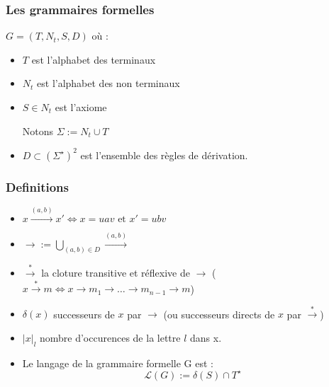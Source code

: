\documentclass[12pt]{beamer}
\title{\letitle}
\author{\leauthor}
\date{}
\newcommand{\norm}[1]{\lvert #1 \rvert}
\begin{document}
\begin{frame}
\titlepage
\end{frame}
    \begin{frame}\frametitle{Les grammaires formelles}

$G = (T,N_t,S,D)$ où :
\begin{itemize}
\item $T$ est l'alphabet des terminaux
\item $N_t$ est l'alphabet des non terminaux
\item $S \in N_t$ est l'axiome

Notons $\Sigma := N_t \cup T$
\item $D \subset (\Sigma ^ \star )^2$ est l'ensemble des règles de dérivation.
\end{itemize}
\end{frame}

\begin{frame}\frametitle{Definitions}
\begin{itemize}
\item $x \overset{(a,b)}{\rightarrow} x' \iff x = uav \text{ et } x' = ubv$
\pause
\item $\rightarrow := \bigcup_{(a,b) \in D} \overset{(a,b)}{\rightarrow}$ 
\pause
\item $\overset{*}{\rightarrow}$ la cloture transitive et réflexive de $\rightarrow$ ($x \overset{*}{\rightarrow} m \iff x \rightarrow m_1 \rightarrow \dots \rightarrow m_{n-1} \rightarrow m$)
\pause
\item $\delta(x)$ successeurs de $x$ par $\rightarrow$ (ou successeurs directs de $x$ par $\overset{*}{\rightarrow}$)
\pause
\item $\norm{x}_l$ nombre d'occurences de la lettre $l$ dans x.
\pause
\item Le langage de la grammaire formelle  G est :
\begin{equation*}\mathcal{L} (G) := \delta(S) \cap T^\star\end{equation*}
\end{itemize}
\end{frame}
\end{document}
